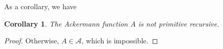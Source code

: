 \documentclass[12pt]{article}
\newtheorem{cor}{Corollary}
\begin{document}
As a corollary, we have
\begin{cor} The Ackermann function $A$ is not primitive recursive. \end{cor}
\begin{proof} Otherwise, $A\in \mathcal{A}$, which is impossible.  \end{proof}
\end{document}
